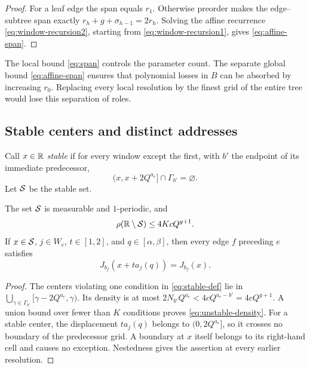 \begin{proof}
For a leaf edge the span equals $r_1$. Otherwise preorder makes the
edge--subtree span exactly $r_h+g+\sigma_{h-1}=2r_h$.
Solving the affine recurrence \eqref{eq:window-recursion2}, starting
from \eqref{eq:window-recursion1}, gives \eqref{eq:affine-span}.
\end{proof}

The local bound \eqref{eq:span} controls the parameter count. The
separate global bound \eqref{eq:affine-span} ensures that polynomial
losses in $B$ can be absorbed by increasing $r_0$. Replacing every
local resolution by the finest grid of the entire tree would lose
this separation of roles.

\subsection{Stable centers and distinct addresses}

Call $x\in\mathbb R$ \emph{stable} if for every window except the first,
with $b'$ the endpoint of its immediate predecessor,
\begin{equation}\label{eq:stable-def}
 (x,x+2Q^{a_e}]\cap\Gamma_{b'}=\varnothing.
\end{equation}
Let $\mathcal S$ be the stable set.

\begin{lemma}\label{lem:stable}
The set $\mathcal S$ is measurable and $1$-periodic, and
\begin{equation}\label{eq:unstable-density}
 \rho(\mathbb R\setminus\mathcal S)\le4KcQ^{g+1}.
\end{equation}
If $x\in\mathcal S$, $j\in W_e$, $t\in[1,2]$, and
$q\in[\alpha,\beta]$, then every edge $f$ preceding $e$ satisfies
\begin{equation}\label{eq:earlier-key}
 J_{b_f}(x+ta_j(q))=J_{b_f}(x).
\end{equation}
\end{lemma}

\begin{proof}
The centers violating one condition in \eqref{eq:stable-def} lie in
$\bigcup_{\gamma\in\Gamma_{b'}}[\gamma-2Q^{a_e},\gamma)$.
Its density is at most $2N_{b'}Q^{a_e}<4cQ^{a_e-b'}=4cQ^{g+1}$.
A union bound over fewer than $K$ conditions proves
\eqref{eq:unstable-density}. For a stable center, the displacement
$ta_j(q)$ belongs to $(0,2Q^{a_e}]$, so it crosses no boundary of the
predecessor grid. A boundary at $x$ itself belongs to its right-hand
cell and causes no exception. Nestedness gives the assertion at every
earlier resolution.
\end{proof}

